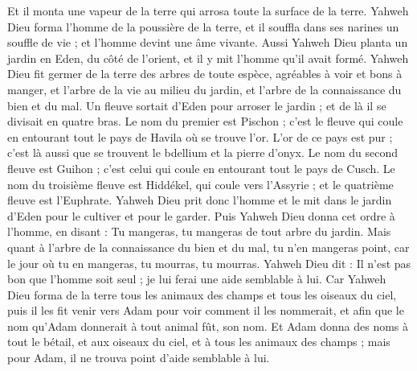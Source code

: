 \begin{multicols}{2}
Et il monta une vapeur de la terre qui arrosa toute la surface de la terre.
Yahweh Dieu forma l'homme de la poussière de la terre, et il souffla dans ses narines un souffle de vie ; et l'homme devint une âme vivante.
Aussi Yahweh Dieu planta un jardin en Eden, du côté de l’orient, et il y mit l'homme qu'il avait formé.
Yahweh Dieu fit germer de la terre des arbres de toute espèce, agréables à voir et bons à manger, et l'arbre de la vie au milieu du jardin, et l'arbre de la connaissance du bien et du mal.
Un fleuve sortait d'Eden pour arroser le jardin ; et de là il se divisait en quatre bras.
Le nom du premier est Pischon ; c'est le fleuve qui coule en entourant tout le pays de Havila où se trouve l'or.
L'or de ce pays est pur ; c'est là aussi que se trouvent le bdellium et la pierre d'onyx.
Le nom du second fleuve est Guihon ; c'est celui qui coule en entourant tout le pays de Cusch.
Le nom du troisième fleuve est Hiddékel, qui coule vers l'Assyrie ; et le quatrième fleuve est l'Euphrate.
Yahweh Dieu prit donc l'homme et le mit dans le jardin d'Eden pour le cultiver et pour le garder.
Puis Yahweh Dieu donna cet ordre à l'homme, en disant : Tu mangeras, tu mangeras de tout arbre du jardin.
Mais quant à l'arbre de la connaissance du bien et du mal, tu n'en mangeras point, car le jour où tu en mangeras, tu mourras, tu mourras.
Yahweh Dieu dit : Il n'est pas bon que l'homme soit seul ; je lui ferai une aide semblable à lui.
Car Yahweh Dieu forma de la terre tous les animaux des champs et tous les oiseaux du ciel, puis il les fit venir vers Adam pour voir comment il les nommerait, et afin que le nom qu'Adam donnerait à tout animal fût, son nom.
Et Adam donna des noms à tout le bétail, et aux oiseaux du ciel, et à tous les animaux des champs ; mais pour Adam, il ne trouva point d'aide semblable à lui.

\end{multicols}
